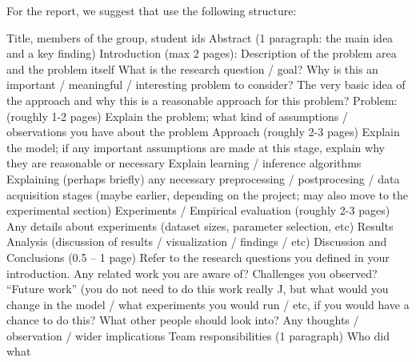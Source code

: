 For the report, we suggest that use the following structure:

Title, members of the group, student ids
Abstract (1 paragraph: the main idea and a key finding)
Introduction (max 2 pages):
Description of the problem area and the problem itself
What is the research question / goal?
Why is this an important / meaningful / interesting problem to consider?
The very basic idea of the approach and why this is a reasonable approach for this problem?
Problem: (roughly 1-2 pages)
Explain the problem; what kind of assumptions / observations you have about the problem
Approach (roughly 2-3 pages)
Explain the model; if any important assumptions are made at this stage, explain why they are reasonable or necessary
Explain learning / inference algorithms
Explaining (perhaps briefly) any necessary preprocessing / postprocesing / data acquisition stages (maybe earlier, depending on the project; may also move to the experimental section)
Experiments / Empirical evaluation (roughly 2-3 pages)
Any details about experiments (dataset sizes, parameter selection, etc)
Results
Analysis (discussion of results / visualization / findings / etc)
Discussion and Conclusions (0.5 – 1 page)
Refer to the research questions you defined in your introduction.
Any related work you are aware of?
Challenges you observed?
“Future work” (you do not need to do this work really J, but what would you change in the model / what experiments you would run / etc, if you would have a chance to do this? What other people should look into?
Any thoughts / observation / wider implications
Team responsibilities (1 paragraph)
Who did what
